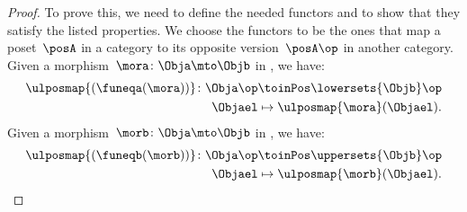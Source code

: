 \begin{proof}
    To prove this, we need to define the needed functors and to show that they satisfy the listed properties.
    We choose the functors to be the ones that map a poset~$\posA$ in a category to its opposite version~$\posA\op$ in another category.
    Given a morphism~$\mora\colon \Obja \mto \Objb$ in \UPos, we have:
    \begin{equation*}
        \begin{aligned}
            \ulposmap{(\funeqa(\mora))}\colon \Obja\op &\toinPos \lowersets{\Objb}\op\\
            \Objael&\mapsto \ulposmap{\mora}(\Objael).
        \end{aligned}
    \end{equation*}
    Given a morphism~$\morb\colon \Obja \mto \Objb$ in \LPos, we have:
    \begin{equation*}
        \begin{aligned}
            \ulposmap{(\funeqb(\morb))}\colon \Obja\op &\toinPos \uppersets{\Objb}\op\\
            \Objael&\mapsto \ulposmap{\morb}(\Objael).
        \end{aligned}
    \end{equation*}

\end{proof}
